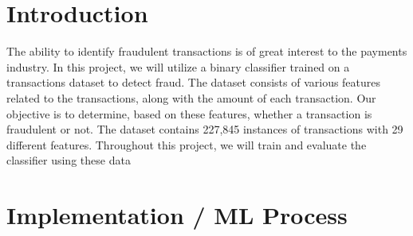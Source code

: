 \documentclass[a4, 10 pt, conference]{ieeeconf}  %
\begin{document}
\section{Introduction}
\label{sec:intro}

{\color{black}

\begin{itemize}
	\textbfn The ability to identify fraudulent transactions is of great interest to the payments industry. In this project, we will utilize a binary classifier trained on a transactions dataset to detect fraud. The dataset consists of various features related to the transactions, along with the amount of each transaction. Our objective is to determine, based on these features, whether a transaction is fraudulent or not. The dataset contains 227,845 instances of transactions with 29 different features. Throughout this project, we will train and evaluate the classifier using these data
\end{itemize}
}


\section{Implementation / ML Process}
\label{sec:methods}
\end{document}
